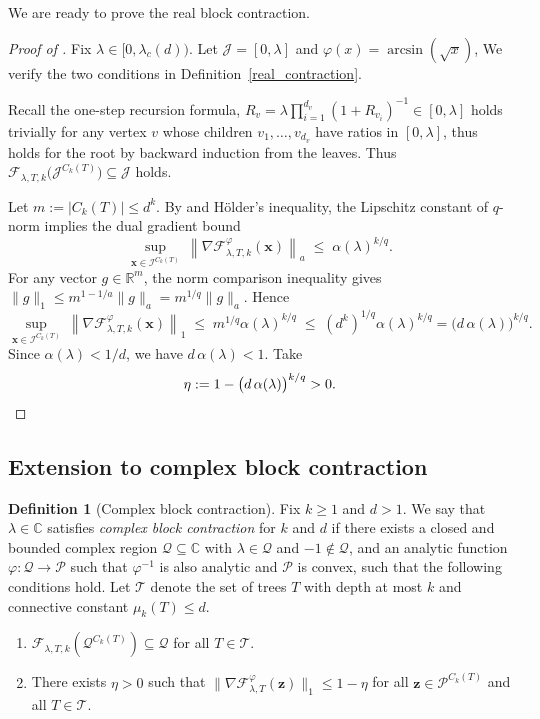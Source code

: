\documentclass[a4paper,11pt]{article}
\theoremstyle{plain}
\theoremstyle{definition}
\newtheorem{definition}[theorem]{Definition}
\theoremstyle{remark}
\newcommand{\1}{\mathbf{1}}
\newcommand{\norm}[1]{\left\lVert#1\right\rVert}
\newcommand{\C}{\mathbb{C}}
\begin{document}
We are ready to prove the real block contraction.

\begin{proof}[Proof of ]
    Fix $\lambda \in [0,\lambda_c(d))$. Let $\mathcal{J}=[0,\lambda]$ and $\varphi(x) = \arcsin(\sqrt{x})$,
We verify the two conditions in Definition~\ref{real_contraction}.

    Recall the one-step recursion formula, $R_v = \lambda \prod_{i=1}^{d_v} (1+R_{v_i})^{-1} \in [0,\lambda]$ holds trivially for any vertex $v$ whose children $v_1,\dots,v_{d_v}$ have ratios in $[0,\lambda]$, thus holds for the root by 
    backward induction from the leaves. Thus 
 $\mathcal{F}_{\lambda,T,k}\bigl(\mathcal{J}^{C_k(T)}\bigr) \subseteq \mathcal{J}$
 holds.

Let $m:=|C_k(T)| \leq d^k$. By  and 
Hölder's inequality, the Lipschitz constant of $q$-norm
implies the dual gradient bound
\[
\sup_{\mathbf{x}\in \mathcal{I}^{C_k(T)}}\ \norm{\nabla \mathcal{F}^{\varphi}_{\lambda,T,k}(\mathbf{x})}_a
\;\le\;
\alpha(\lambda)^{k/q}.
\]
For any vector $g\in\mathbb{R}^{m}$, the norm comparison inequality gives
$\|g\|_1 \le m^{1-1/a}\|g\|_a = m^{1/q}\|g\|_a$.
Hence
\[
\sup_{\mathbf{x}\in \mathcal{I}^{C_k(T)}}\ \norm{\nabla \mathcal{F}^{\varphi}_{\lambda,T,k}(\mathbf{x})}_1
\;\le\;
m^{1/q}\alpha(\lambda)^{k/q}
\;\le\;
(d^k)^{1/q}\alpha(\lambda)^{k/q}
=
\bigl(d\,\alpha(\lambda)\bigr)^{k/q}.
\]
Since $\alpha(\lambda)<1/d$, we have $d\,\alpha(\lambda)<1$.
Take
\[
\eta := 1-\bigl(d\,\alpha(\lambda)\bigr)^{k/q}>0.\qedhere
\]
\end{proof}

\subsection{Extension to complex block contraction}

\begin{definition}[Complex block contraction]
\label{def:complex_contraction}
Fix $k\ge 1$ and $d>1$.
We say that $\lambda \in \C$ satisfies \emph{complex block contraction}
for $k$ and $d$ if there exists a closed and bounded complex region
$\mathcal{Q}\subseteq \C$ with $\lambda\in\mathcal{Q}$ and $-1 \notin \mathcal{Q}$,
and an analytic function $\varphi:\mathcal{Q}\to\mathcal{P}$ such that
$\varphi^{-1}$ is also analytic and $\mathcal{P}$ is convex, such that the
following conditions hold.
Let $\mathcal{T}$ denote the set of trees $T$ with depth at most $k$
and connective constant $\mu_k(T)\le d$.
\begin{enumerate}[leftmargin=2em]
    \item $\mathcal{F}_{\lambda,T,k}(\mathcal{Q}^{C_k(T)}) \subseteq \mathcal{Q}$
    for all $T\in \mathcal{T}$.
    
    \item There exists $\eta>0$ such that
    $\bigl\|\nabla \mathcal{F}^{\varphi}_{\lambda,T}(\mathbf z)\bigr\|_{1}
    \le 1-\eta$
    for all $\mathbf z\in \mathcal{P}^{C_k(T)}$ and all $T\in \mathcal{T}$.
\end{enumerate}
\end{definition}
\end{document}
